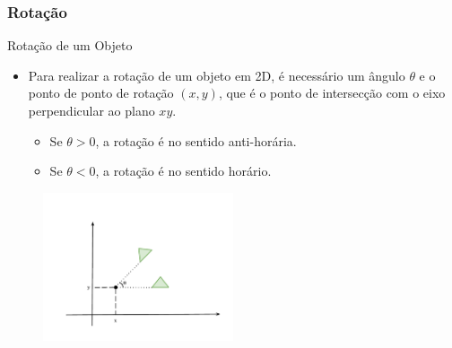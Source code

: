 \documentclass[fleqn]{beamer}
\begin{document}
\begin{frame}
\frametitle{Rotação}


	\begin{block}{Rotação de um Objeto}
		\begin{itemize}
			\item Para realizar a rotação de um objeto em 2D, é necessário um ângulo $\theta$ e o ponto de ponto de rotação $(x,y)$, que é o ponto de intersecção com o eixo perpendicular ao plano $xy$.
			\begin{itemize}
				\item Se $\theta > 0$, a rotação é no sentido anti-horária.
				\item Se $\theta < 0$, a rotação é no sentido horário.
			\end{itemize}
		\end{itemize}
	\end{block}
	
	\begin{figure}[!h]
			\begin{center}
			\includegraphics[width=0.5\textwidth]{Figures/ExemploRotacao}
			\end{center}
	\end{figure}
	
\end{frame}

\end{document}
